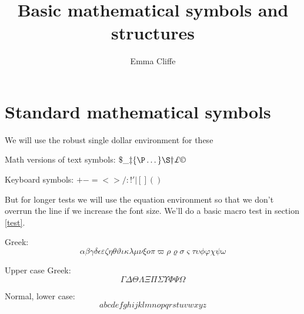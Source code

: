 


\title{Basic mathematical symbols and structures}
\author{Emma Cliffe}
\date{}

\usepackage{calc}
\usepackage{longtable}
\usepackage{tabu}
\usepackage{breqn}
\setlength{\arraycolsep}{0.800000em}
\renewcommand{\arraystretch}{1.400000}

\renewcommand{\baselinestretch}{1.250000}
\selectfont
\setlength{\parskip}{1.0\baselineskip}

\maketitle
\tableofcontents
{}

\section{Standard mathematical symbols}

We will use the robust single dollar environment for these

Math versions of text symbols: \(\$  \_  \ddag  \{  \P  \dots  \}  \S  \dag  \pounds \copyright\)

Keyboard symbols: \(+  -  =  <  >  /  :  !  '  |  [  ]  (  )\)

\noindent 
But for longer tests we will use the equation environment so that we don't overrun the line if we increase the font size. We'll do a basic macro test in section \ref{test}.

Greek:
\begin{dmath}[compact,spread={1.250000\baselineskip}] \alpha  \beta  \gamma  \delta  \epsilon  \varepsilon  \zeta  \eta  \theta  \vartheta  \iota  \kappa  \lambda  \mu  \nu  \xi  o  \pi  \varpi  \rho  \varrho  \sigma  \varsigma  \tau  \upsilon  \phi  \varphi  \chi  \psi  \omega \end{dmath}

Upper case Greek:
\begin{dmath}[compact,spread={1.250000\baselineskip}] \Gamma  \Delta  \Theta  \Lambda  \Xi  \Pi  \Sigma  \Upsilon  \Phi  \Psi  \Omega \end{dmath}

Normal, lower case:
\begin{dmath}[compact,spread={1.250000\baselineskip}] a  b  c  d  e  f  g  h  i  j  k  l  m  n  o  p  q  r  s  t  u  v  w  x  y  z \end{dmath}

